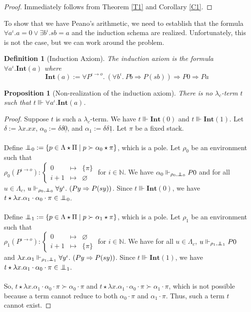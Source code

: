 \documentclass[a4paper,12pt]{article}
\newtheorem{prop}[theo]{Proposition}
\newtheorem{defi}[theo]{Definition}
\theoremstyle{rmqstyle}
\newcommand{\N}{\mathbb{N}}
\newcommand{\set}[1]{\{#1\}}
\newcommand{\fundef}[3]{#1: \left\{\begin{array}{ccc}#2\\#3\end{array}\right.}
\renewcommand{\int}{\mathbf{Int}}
\renewcommand{\implies}{\Rightarrow}
\newcommand{\pole}{{\protect\mathpalette{\protect\polehelper}{\bot}}} \def\polehelper#1#2{\mathrel{\rlap{$#1#2$}\mkern3mu{#1#2}}}
\newcommand{\Kri}[1]{\underline{#1}}
\begin{document}
\begin{proof}
Immediately follows from Theorem \ref{T1} and Corollary \ref{C1}.
\end{proof}

To show that we have Peano's arithmetic, we need to establish that the formula $\forall a^\iota. a = 0 \lor \exists b^\iota. sb = a$ and the induction schema are realized. Unfortunately, this is not the case, but we can work around the problem.

\begin{defi}[Induction Axiom]
The induction axiom is the formula $\forall a^\iota. \int(a)$ where
$$\int(a) := \forall P^{\iota \to o}. \ (\forall b^\iota. \ Pb \implies P(sb))\implies P0 \implies Pa$$ 
\end{defi}

\begin{prop}[Non-realization of the induction axiom]
\label{non rec}
There is no $\lambda_c$-term $t$ such that $t \Vvdash \forall a^\iota. \int(a)$.
\end{prop}

\begin{proof}
Suppose $t$ is such a $\lambda_c$-term. We have $t \Vvdash \int(0)$ and $t \Vvdash \int(1)$. Let $\delta := \lambda x. xx$, $\alpha_0 := \delta \delta \Kri{0}$, and $\alpha_1 := \delta \delta \Kri{1}$. Let $\pi$ be a fixed stack. \\
\\
Define $\pole_0 := \set{ p \in \Lambda \star \Pi \mid p \succ \alpha_0 \star \pi}$, which is a pole. Let $\rho_0$ be an environment such that\\
$\fundef{\rho_0(P^{\iota \to o})}{0 &\mapsto &\set{\pi}}{i +1 &\mapsto &\varnothing}$ for $i \in \N$. We have $\alpha_0 \Vdash_{\rho_0, \pole_0} P0$ and for all $u \in \Lambda_c$, $u \Vdash_{\rho_0, \pole_0} \forall y^\iota. \ (Py \implies P(sy))$. Since $t \Vvdash \int(0)$, we have $t \star \lambda x. \alpha_1 \cdot \alpha_0 \cdot \pi \in \pole_0$.\\
\\
Define $\pole_1 := \set{ p \in \Lambda \star \Pi \mid p \succ \alpha_1 \star \pi}$, which is a pole. Let $\rho_1$ be an environment such that\\
$\fundef{\rho_1(P^{\iota \to o})}{0 &\mapsto &\varnothing}{i +1 &\mapsto &\set{\pi}}$ for $i \in \N$. We have for all $u \in \Lambda_c$, $u \Vdash_{\rho_1, \pole_1} P0$ and $\lambda x. \alpha_1 \Vdash_{\rho_1, \pole_1} \forall y^\iota. \ (Py \implies P(sy))$. Since $t \Vvdash \int(1)$, we have $t \star \lambda x. \alpha_1 \cdot \alpha_0 \cdot \pi \in \pole_1$.\\
\\
So, $t \star \lambda x. \alpha_1 \cdot \alpha_0 \cdot \pi \succ \alpha_0 \cdot \pi$ and $t \star \lambda x. \alpha_1 \cdot \alpha_0 \cdot \pi \succ \alpha_1 \cdot \pi$, which is not possible because a term cannot reduce to both $ \alpha_0 \cdot \pi$ and $ \alpha_1 \cdot \pi$. Thus, such a term $t$ cannot exist. 
\end{proof}
\end{document}
